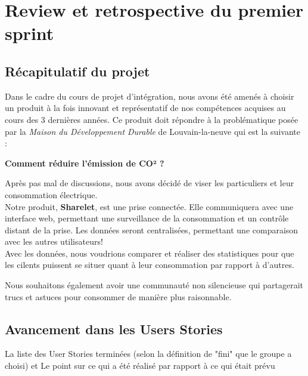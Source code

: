 \chapter{Review et retrospective du premier sprint}

\section{Récapitulatif du projet}

Dans le cadre du cours de projet d'intégration, nous avons été amenés à choisir un produit à la fois innovant et représentatif de nos compétences acquises au cours des 3 dernières années. Ce produit doit répondre à la problématique posée par la  \textit{Maison du Développement Durable} de Louvain-la-neuve qui est la suivante : 
\begin{center}
\textbf{Comment réduire l'émission de CO² ?}
\end{center}

Après pas mal de discussions, nous avons décidé de viser les particuliers et leur consommation électrique.  \\


Notre produit, \textbf{Sharelet}, est une prise connectée. Elle communiquera avec une interface web, permettant une surveillance de la consommation et un contrôle distant de la prise. Les données seront centralisées, permettant une comparaison avec les autres utilisateurs!  \\ 

Avec les données, nous voudrions comparer et réaliser des statistiques pour que les cilents puissent se situer quant à leur consommation par rapport à d'autres. 

Nous souhaitons également avoir une communauté non silencieuse qui partagerait trucs et astuces pour consommer de manière plus raisonnable. 


\section{Avancement dans les Users Stories}
​La liste des User Stories terminées (selon la définition de "fini" que le groupe a choisi) et 
Le point sur ce qui a été réalisé par rapport à ce qui était prévu
